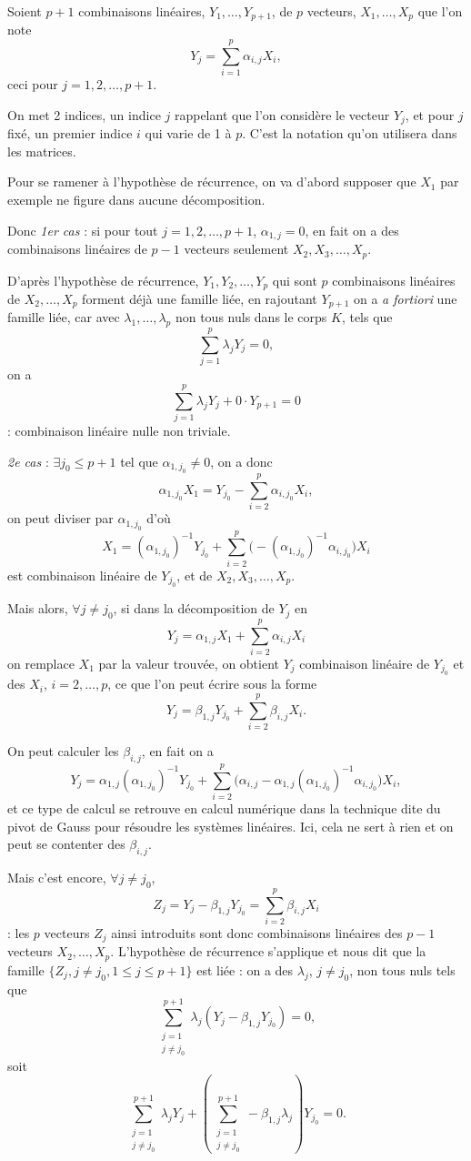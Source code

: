 Soient $p+1$ combinaisons linéaires, $Y_1,\ldots,Y_{p+1}$, de $p$ vecteurs, $X_1,\ldots,X_p$ que l'on note
\[
Y_j=\sum_{i=1}^p\alpha_{i,j}X_i,
\]
ceci pour $j=1,2,\ldots,p+1$.

On met 2 indices, un indice $j$ rappelant que l'on considère le vecteur $Y_j$, et pour $j$ fixé, un premier indice $i$ qui varie de 1 à $p$. C'est la notation qu'on utilisera dans les matrices.

Pour se ramener à l'hypothèse de récurrence, on va d'abord supposer que $X_1$ par exemple ne figure dans aucune décomposition.

Donc \emph{1er cas} : si pour tout $j=1,2,\ldots,p+1$, $\alpha_{1,j}=0$, en fait on a des combinaisons linéaires de $p-1$ vecteurs seulement $X_2,X_3,\ldots,X_p$.

D'après l'hypothèse de récurrence, $Y_1,Y_2,\ldots,Y_p$ qui sont $p$ combinaisons linéaires de $X_2,\ldots,X_p$ forment déjà une famille liée, en rajoutant $Y_{p+1}$ on a \emph{a fortiori} une famille liée, car avec $\lambda_1,\ldots,\lambda_p$ non tous nuls dans le corps $K$, tels que
\[
\sum_{j=1}^p\lambda_jY_j=0,
\]
on a
\[
\sum_{j=1}^p\lambda_jY_j+0\cdot Y_{p+1}=0
\]
: combinaison linéaire nulle non triviale.

\emph{2e cas} : $\exists j_0\le p+1$ tel que $\alpha_{1,j_0}\ne0$, on a donc
\[
\alpha_{1,j_0}X_1=Y_{j_0}-\sum_{i=2}^p\alpha_{i,j_0}X_i,
\]
on peut diviser par $\alpha_{1,j_0}$ d'où
\[
X_1=(\alpha_{1,j_0})^{-1}Y_{j_0}+\sum_{i=2}^p\bigl(-(\alpha_{1,j_0})^{-1}\alpha_{i,j_0}\bigr)X_i
\]
est combinaison linéaire de $Y_{j_0}$, et de $X_2,X_3,\ldots,X_p$.

Mais alors, $\forall j\ne j_0$, si dans la décomposition de $Y_j$ en
\[
Y_j=\alpha_{1,j}X_1+\sum_{i=2}^p\alpha_{i,j}X_i
\]
on remplace $X_1$ par la valeur trouvée, on obtient $Y_j$ combinaison linéaire de $Y_{j_0}$ et des $X_i$, $i=2,\ldots,p$, ce que l'on peut écrire sous la forme
\[
Y_j=\beta_{1,j}Y_{j_0}+\sum_{i=2}^p\beta_{i,j}X_i.
\]

On peut calculer les $\beta_{i,j}$, en fait on a
\[
Y_j=\alpha_{1,j}(\alpha_{1,j_0})^{-1}Y_{j_0}+\sum_{i=2}^p\bigl(\alpha_{i,j}-\alpha_{1,j}(\alpha_{1,j_0})^{-1}\alpha_{i,j_0}\bigr)X_i,
\]
et ce type de calcul se retrouve en calcul numérique dans la technique dite du pivot de Gauss pour résoudre les systèmes linéaires. Ici, cela ne sert à rien et on peut se contenter des $\beta_{i,j}$.

Mais c'est encore, $\forall j\ne j_0$,
\[
Z_j=Y_j-\beta_{1,j}Y_{j_0}=\sum_{i=2}^p\beta_{i,j}X_i
\]
: les $p$ vecteurs $Z_j$ ainsi introduits sont donc combinaisons linéaires des $p-1$ vecteurs $X_2,\ldots,X_p$. L'hypothèse de récurrence s'applique et nous dit que la famille $\{Z_j,j\ne j_0,1\le j\le p+1\}$ est liée : on a des $\lambda_j$, $j\ne j_0$, non tous nuls tels que
\[
\sum_{\substack{j=1\\j\ne j_0}}^{p+1}\lambda_j(Y_j-\beta_{1,j}Y_{j_0})=0,
\]
soit
\[
\sum_{\substack{j=1\\j\ne j_0}}^{p+1}\lambda_jY_j+\left(\sum_{\substack{j=1\\j\ne j_0}}^{p+1}-\beta_{1,j}\lambda_j\right)Y_{j_0}=0.
\]

